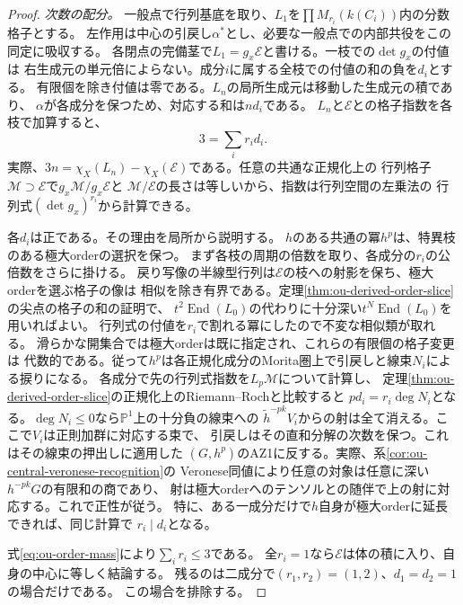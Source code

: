 \documentclass[11pt,a4paper]{ltjsarticle}
\theoremstyle{definition}
\begin{document}
\begin{proof}
\emph{次数の配分。}
一般点で行列基底を取り、$L_1$を$\prod M_{r_i}(k(C_i))$内の分数格子とする。
左作用は中心の引戻し$\alpha^*$とし、必要な一般点での内部共役をこの同定に吸収する。
各閉点の完備茎で$L_1=g_x\mathcal E$と書ける。一枝での$\det g_x$の付値は
右生成元の単元倍によらない。成分$i$に属する全枝での付値の和の負を$d_i$とする。
有限個を除き付値は零である。$L_n$の局所生成元は移動した生成元の積であり、
$\alpha$が各成分を保つため、対応する和は$nd_i$である。
$L_n$と$\mathcal E$との格子指数を各枝で加算すると、
\[
                        3=\sum_i r_i d_i .                    \tag{1}\label{eq:ou-order-mass}
\]
実際、$3n=\chi_X(L_n)-\chi_X(\mathcal E)$である。任意の共通な正規化上の
行列格子$\mathcal M\supset\mathcal E$で$g_x\mathcal M/g_x\mathcal E$と
$\mathcal M/\mathcal E$の長さは等しいから、指数は行列空間の左乗法の
行列式$(\det g_x)^{r_i}$から計算できる。

各$d_i$は正である。その理由を局所から説明する。
$h$のある共通の冪$h^p$は、特異枝のある極大orderの選択を保つ。
まず各枝の周期の倍数を取り、各成分の$r_i$の公倍数をさらに掛ける。
戻り写像の半線型行列は$\mathcal E$の枝への射影を保ち、極大orderを選ぶ格子の像は
相似を除き有界である。定理\ref{thm:ou-derived-order-slice}の尖点の格子の和の証明で、
$t^2\operatorname{End}(L_0)$の代わりに十分深い$t^N\operatorname{End}(L_0)$を用いればよい。
行列式の付値を$r_i$で割れる冪にしたので不変な相似類が取れる。
滑らかな開集合では極大orderは既に指定され、これらの有限個の格子変更は
代数的である。従って$h^p$は各正規化成分のMorita圏上で引戻しと線束$N_i$による捩りになる。
各成分で先の行列式指数を$L_p\mathcal M$について計算し、
定理\ref{thm:ou-derived-order-slice}の正規化上のRiemann--Rochと比較すると
$p d_i=r_i\deg N_i$となる。$\deg N_i\le0$なら$\mathbb P^1$上の十分負の線束への
$\widetilde h^{-pk}V_i$からの射は全て消える。ここで$V_i$は正則加群に対応する束で、
引戻しはその直和分解の次数を保つ。これはその線束の押出しに適用した
$(G,h^p)$のAZ1に反する。実際、系\ref{cor:ou-central-veronese-recognition}の
Veronese同値により任意の対象は任意に深い$h^{-pk}G$の有限和の商であり、
射は極大orderへのテンソルとの随伴で上の射に対応する。これで正性が従う。
特に、ある一成分だけで$h$自身が極大orderに延長できれば、同じ計算で
$r_i\mid d_i$となる。

式\eqref{eq:ou-order-mass}により$\sum_i r_i\le3$である。
全$r_i=1$なら$\mathcal E$は体の積に入り、自身の中心に等しく結論する。
残るのは二成分で$(r_1,r_2)=(1,2)$、$d_1=d_2=1$の場合だけである。
この場合を排除する。


\end{proof}
\end{document}
